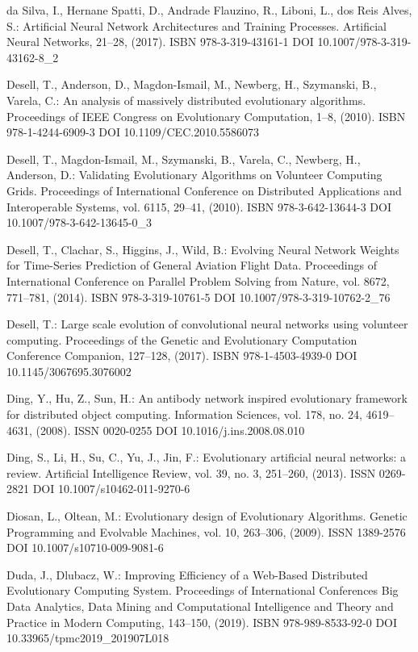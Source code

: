 \begin{thebibliography}{99.}
 da Silva, I., Hernane Spatti, D., Andrade Flauzino, R., Liboni, L., dos Reis Alves, S.: Artificial Neural Network Architectures and Training Processes. Artificial Neural Networks, 21--28, (2017). ISBN 978-3-319-43161-1 DOI 10.1007/978-3-319-43162-8\_2

 Desell, T., Anderson, D., Magdon-Ismail, M., Newberg, H., Szymanski, B., Varela, C.: An analysis of massively distributed evolutionary algorithms. Proceedings of IEEE Congress on Evolutionary Computation, 1--8, (2010). ISBN 978-1-4244-6909-3 DOI 10.1109/CEC.2010.5586073

 Desell, T., Magdon-Ismail, M., Szymanski, B., Varela, C., Newberg, H., Anderson, D.: Validating Evolutionary Algorithms on Volunteer Computing Grids. Proceedings of International Conference on Distributed Applications and Interoperable Systems, vol. 6115, 29--41, (2010). ISBN 978-3-642-13644-3 DOI 10.1007/978-3-642-13645-0\_3

 Desell, T., Clachar, S., Higgins, J., Wild, B.: Evolving Neural Network Weights for Time-Series Prediction of General Aviation Flight Data. Proceedings of International Conference on Parallel Problem Solving from Nature, vol. 8672, 771--781, (2014). ISBN 978-3-319-10761-5 DOI 10.1007/978-3-319-10762-2\_76

 Desell, T.: Large scale evolution of convolutional neural networks using volunteer computing. Proceedings of the Genetic and Evolutionary Computation Conference Companion, 127--128, (2017). ISBN 978-1-4503-4939-0 DOI 10.1145/3067695.3076002

 Ding, Y., Hu, Z., Sun, H.: An antibody network inspired evolutionary framework for distributed object computing. Information Sciences, vol. 178, no. 24, 4619--4631, (2008). ISSN 0020-0255 DOI 10.1016/j.ins.2008.08.010

 Ding, S., Li, H., Su, C., Yu, J., Jin, F.: Evolutionary artificial neural networks: a review. Artificial Intelligence Review, vol. 39, no. 3, 251--260, (2013). ISSN 0269-2821 DOI 10.1007/s10462-011-9270-6

 Diosan, L., Oltean, M.: Evolutionary design of Evolutionary Algorithms. Genetic Programming and Evolvable Machines, vol. 10, 263--306, (2009). ISSN 1389-2576 DOI 10.1007/s10710-009-9081-6

 Duda, J., Dlubacz, W.: Improving Efficiency of a Web-Based Distributed Evolutionary Computing System. Proceedings of International Conferences Big Data Analytics, Data Mining and Computational Intelligence and Theory and Practice in Modern Computing, 143--150, (2019). ISBN 978-989-8533-92-0 DOI 10.33965/tpmc2019\_201907L018


\end{thebibliography}
